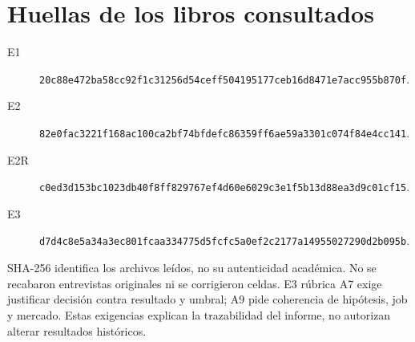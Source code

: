 \documentclass[11pt,a4paper]{report}
\begin{document}
\section{Huellas de los libros consultados}
\begin{description}
\item[E1] \nolinkurl{20c88e472ba58cc92f1c31256d54ceff504195177ceb16d8471e7acc955b870f}.
\item[E2] \nolinkurl{82e0fac3221f168ac100ca2bf74bfdefc86359ff6ae59a3301c074f84e4cc141}.
\item[E2R] \nolinkurl{c0ed3d153bc1023db40f8ff829767ef4d60e6029c3e1f5b13d88ea3d9c01cf15}.
\item[E3] \nolinkurl{d7d4c8e5a34a3ec801fcaa334775d5fcfc5a0ef2c2177a14955027290d2b095b}.
\end{description}
SHA-256 identifica los archivos leídos, no su autenticidad académica. No se recabaron entrevistas originales ni se corrigieron celdas. E3 rúbrica A7 exige justificar decisión contra resultado y umbral; A9 pide coherencia de hipótesis, job y mercado. Estas exigencias explican la trazabilidad del informe, no autorizan alterar resultados históricos.
\end{document}
